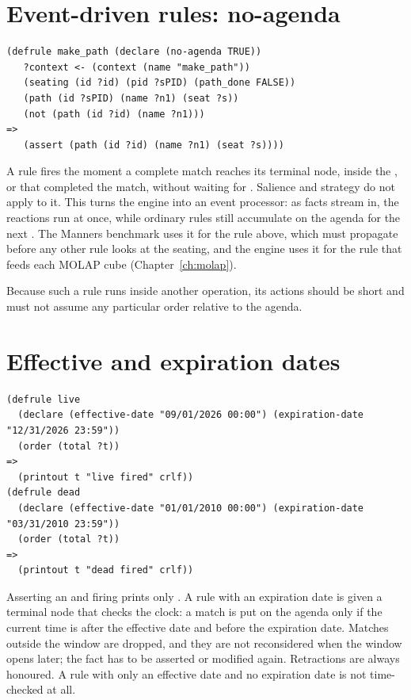 \section{Event-driven rules: no-agenda}
\label{sec:no-agenda}

\begin{lstlisting}
(defrule make_path (declare (no-agenda TRUE))
   ?context <- (context (name "make_path"))
   (seating (id ?id) (pid ?sPID) (path_done FALSE))
   (path (id ?sPID) (name ?n1) (seat ?s))
   (not (path (id ?id) (name ?n1)))
=>
   (assert (path (id ?id) (name ?n1) (seat ?s))))
\end{lstlisting}

A  rule fires the moment a complete match reaches its
terminal node, inside the ,  or  that
completed the match, without waiting for . Salience and
strategy do not apply to it. This turns the engine into an event
processor: as facts stream in, the reactions run at once, while ordinary
rules still accumulate on the agenda for the next . The Manners
benchmark uses it for the rule above, which must propagate before any
other rule looks at the seating, and the engine uses it for the rule that
feeds each MOLAP cube (Chapter~\ref{ch:molap}).

Because such a rule runs inside another operation, its actions should be
short and must not assume any particular order relative to the agenda.

\section{Effective and expiration dates}
\label{sec:rule-dates}

\begin{lstlisting}
(defrule live
  (declare (effective-date "09/01/2026 00:00") (expiration-date "12/31/2026 23:59"))
  (order (total ?t))
=>
  (printout t "live fired" crlf))
(defrule dead
  (declare (effective-date "01/01/2010 00:00") (expiration-date "03/31/2010 23:59"))
  (order (total ?t))
=>
  (printout t "dead fired" crlf))
\end{lstlisting}

Asserting an  and firing prints only . A rule
with an expiration date is given a terminal node that checks the clock: a
match is put on the agenda only if the current time is after the
effective date and before the expiration date. Matches outside the window
are dropped, and they are not reconsidered when the window opens later;
the fact has to be asserted or modified again. Retractions are always
honoured. A rule with only an effective date and no expiration date is
not time-checked at all.

